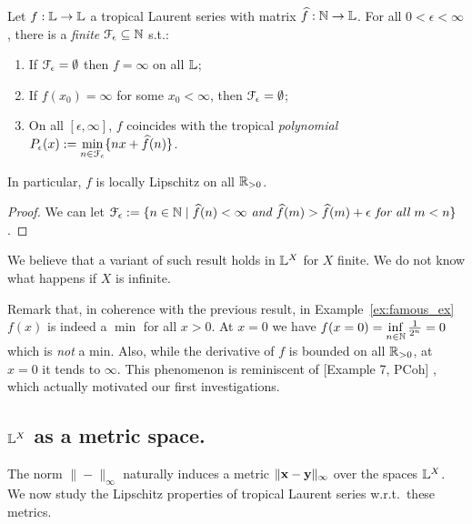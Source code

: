 \begin{theorem}\label{theorem:fepsilon}
 Let $f:\mathbb{L}\to\mathbb{L}$ a tropical Laurent series with matrix $\widehat f:\mathbb{N}\to\mathbb{L}$.
 For all $0<\epsilon<\infty$, there is a \emph{finite} $\mathcal{F}_\epsilon \subseteq \mathbb{N}$ s.t.:
 \begin{enumerate}
  \item If $\mathcal{F}_\epsilon=\emptyset$ then $f=\infty$ on all $\mathbb{L}$;
  \item If $f(x_0)=\infty$ for some $x_0<\infty$, then $\mathcal{F}_\epsilon=\emptyset$;
  \item On all $[\epsilon,\infty]$, $f$ coincides with the tropical \emph{polynomial} $P_\epsilon(x):=\min\limits_{n\in \mathcal{F}_\epsilon}\{nx+\widehat f(n)\}$.
 \end{enumerate}
 In particular, $f$ is locally Lipschitz on all $\mathbb{R}_{>0}$.
\end{theorem}
\begin{proof}
 We can let $\mathcal{F}_\epsilon:=\{n\in\mathbb{N} \mid
 \widehat f(n)<\infty \textit{ and } \widehat f(m)> \widehat f(m)+\epsilon \textit{ for all } m<n\}$.
\end{proof}

We believe that a variant of such result holds in $\mathbb{L}^X$ for $X$ finite.
We do not know what happens if $X$ is infinite.

Remark that, in coherence with the previous result, in Example~\ref{ex:famous_ex} $f(x)$ is indeed a $\min$ for all $x>0$.
At $x=0$ we have $f(x=0)=\inf\limits_{n\in\mathbb{N}} \frac{1}{2^n}=0$ which is \emph{not} a min.
Also, while the derivative of $f$ is bounded on all $\mathbb{R}_{>0}$, at $x=0$ it tends to $\infty$.
This phenomenon is reminiscent of [Example 7, PCoh]
, which actually motivated our first investigations.




\subsection{$\mathbb{L}^{X}$ as a metric space.}



The norm $\|-\|_\infty$ naturally induces a metric $\|\mathbf{x}-\mathbf{y}\|_{\infty}$ over the spaces $\mathbb{L}^{X}$. 
We now study the Lipschitz properties of tropical Laurent series w.r.t.~these metrics. 

